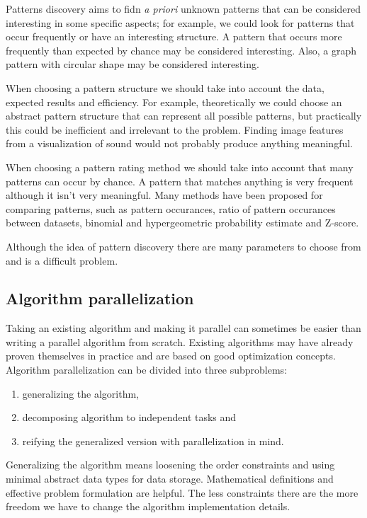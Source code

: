 Patterns discovery aims to fidn \emph{a priori} unknown patterns that can be considered interesting in some specific aspects; for example, we could look for patterns that occur frequently or have an interesting structure. A pattern that occurs more frequently than expected by chance may be considered interesting. Also, a graph pattern with circular shape may be considered interesting.

When choosing a pattern structure we should take into account the data, expected results and efficiency. For example, theoretically we could choose an abstract pattern structure that can represent all possible patterns, but practically this could be inefficient and irrelevant to the problem. Finding image features from a visualization of sound would not probably produce anything meaningful.

When choosing a pattern rating method we should take into account that many patterns can occur by chance. \hmm A pattern that matches anything is very frequent although it isn't very meaningful. Many methods have been proposed for comparing patterns, such as pattern occurances, ratio of pattern occurances between datasets, binomial and hypergeometric probability estimate and Z-score.\insertref

Although the idea of pattern discovery there are many parameters to choose from and is a difficult problem.

\subsection{Algorithm parallelization}

Taking an existing algorithm and making it parallel can sometimes be easier than writing a parallel algorithm from scratch. Existing algorithms may have already proven themselves in practice and are based on good optimization concepts. Algorithm parallelization can be divided into three subproblems:

\begin{enumerate}
	\item generalizing the algorithm,
	\item decomposing algorithm to independent tasks and
	\item reifying the generalized version with parallelization in mind.
\end{enumerate}

Generalizing the algorithm means loosening the order constraints and using minimal abstract data types for data storage. Mathematical definitions and effective problem formulation are helpful. The less constraints there are the more freedom we have to change the algorithm implementation details.

